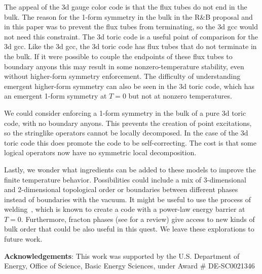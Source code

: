 \documentclass[twocolumn, longbibliography]{revtex4-2}
\begin{document}
The appeal of the 3d gauge color code is that the flux tubes do not end in the bulk.
The reason for the 1-form symmetry in the bulk in the R\&B proposal and in this paper was to prevent the flux tubes from terminating, so the 3d gcc would not need this constraint.
The 3d toric code is a useful point of comparison for the 3d gcc.
Like the 3d gcc, the 3d toric code has flux tubes that do not terminate in the bulk.
If it were possible to couple the endpoints of these flux tubes to boundary anyons this may result in some nonzero-temperature stability, even without higher-form symmetry enforcement. The difficulty of understanding emergent higher-form symmetry can also be seen in the 3d toric code, which has an emergent 1-form symmetry at $T=0$ but not at nonzero temperatures. 

We could consider enforcing a 1-form symmetry in the bulk of a pure 3d toric code, with no boundary anyons.
This prevents the creation of point excitations, so the stringlike operators cannot be locally decomposed. 
In the case of the 3d toric code this does promote the code to be self-correcting. The cost is that some logical operators now have no symmetric local decomposition. 

Lastly, we wonder what ingredients can be added to these models to improve the finite temperature behavior. Possibilities could include a mix of 3-dimensional and 2-dimensional topological order or boundaries between different phases instead of boundaries with the vacuum. It might be useful to use the process of welding~\cite{MichnickiPowerLaw}, which is known to create a code with a power-law energy barrier at $T=0$. Furthermore, fracton phases (see \cite{fractonarcmp} for a review) give access to new kinds of bulk order that could be also useful in this quest. We leave these explorations to future work. 

{\bf Acknowledgements}: This work was supported by the U.S. Department of Energy, Office of Science, Basic Energy Sciences, under Award \# DE-SC0021346

\end{document}
